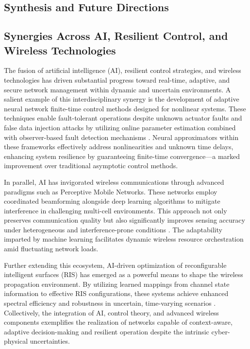 \documentclass[11pt]{article}
\begin{document}
\begin{itemize}
\section{Synthesis and Future Directions}

\subsection{Synergies Across AI, Resilient Control, and Wireless Technologies}

The fusion of artificial intelligence (AI), resilient control strategies, and wireless technologies has driven substantial progress toward real-time, adaptive, and secure network management within dynamic and uncertain environments. A salient example of this interdisciplinary synergy is the development of adaptive neural network finite-time control methods designed for nonlinear systems. These techniques enable fault-tolerant operations despite unknown actuator faults and false data injection attacks by utilizing online parameter estimation combined with observer-based fault detection mechanisms \cite{ref46}. Neural approximators within these frameworks effectively address nonlinearities and unknown time delays, enhancing system resilience by guaranteeing finite-time convergence—a marked improvement over traditional asymptotic control methods.

In parallel, AI has invigorated wireless communications through advanced paradigms such as Perceptive Mobile Networks. These networks employ coordinated beamforming alongside deep learning algorithms to mitigate interference in challenging multi-cell environments. This approach not only preserves communication quality but also significantly improves sensing accuracy under heterogeneous and interference-prone conditions \cite{ref47}. The adaptability imparted by machine learning facilitates dynamic wireless resource orchestration amid fluctuating network loads.

Further extending this ecosystem, AI-driven optimization of reconfigurable intelligent surfaces (RIS) has emerged as a powerful means to shape the wireless propagation environment. By utilizing learned mappings from channel state information to effective RIS configurations, these systems achieve enhanced spectral efficiency and robustness in uncertain, time-varying scenarios \cite{ref48}. Collectively, the integration of AI, control theory, and advanced wireless components exemplifies the realization of networks capable of context-aware, adaptive decision-making and resilient operation despite the intrinsic cyber-physical uncertainties.


\end{itemize}
\end{document}
